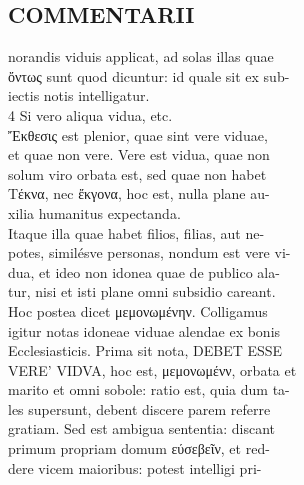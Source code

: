 \documentclass{article}
\begin{document}
\begin{pages}
\section*{COMMENTARII \\
                }norandis viduis applicat, ad solas illas quae \\
                ὄντως sunt quod dicuntur: id quale sit ex sub- \\
                iectis notis intelligatur. \\
                4 Si vero aliqua vidua, etc. \\
                Ἔκθεσις est plenior, quae sint vere viduae, \\
                et quae non vere. Vere est vidua, quae non \\
                solum viro orbata est, sed quae non habet \\
                Τέκνα, nec ἔκγονα, hoc est, nulla plane au- \\
                xilia humanitus expectanda. \\
                Itaque illa quae habet filios, filias, aut ne- \\
                potes, similésve personas, nondum est vere vi- \\
                dua, et ideo non idonea quae de publico ala- \\
                tur, nisi et isti plane omni subsidio careant. \\
                Hoc postea dicet μεμονωμένην. Colligamus \\
                igitur notas idoneae viduae alendae ex bonis \\
                Ecclesiasticis. Prima sit nota, DEBET ESSE \\
                VERE' VIDVA, hoc est, μεμονωμένν, orbata et \\
                marito et omni sobole: ratio est, quia dum ta- \\
                les supersunt, debent discere parem referre \\
                gratiam. Sed est ambigua sententia: discant \\
                primum propriam domum εύσεβεῖν, et red- \\
                dere vicem maioribus: potest intelligi pri- \\

\end{pages}
\end{document}
